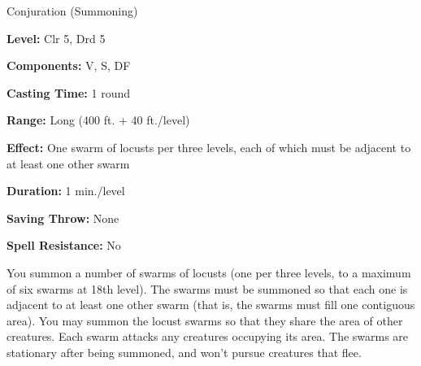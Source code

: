 
Conjuration (Summoning)

\textbf{Level:} Clr 5, Drd 5

\textbf{Components:} V, S, DF

\textbf{Casting Time:} 1 round

\textbf{Range:} Long (400 ft. + 40 ft./level)

\textbf{Effect:} One swarm of locusts per three levels, each of which must be adjacent 
to at least one other swarm

\textbf{Duration:} 1 min./level

\textbf{Saving Throw:} None

\textbf{Spell Resistance:} No

You summon a number of swarms of locusts (one per three levels, to a maximum of 
six swarms at 18th level). The swarms must be summoned so that each one is adjacent 
to at least one other swarm (that is, the swarms must fill one contiguous area). 
You may summon the locust swarms so that they share the area of other creatures. 
Each swarm attacks any creatures occupying its area. The swarms are stationary 
after being summoned, and won't pursue creatures that flee.

